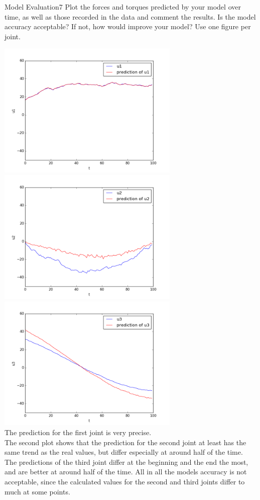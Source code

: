 \begin{questions}
\begin{question}{Model Evaluation}{7}
Plot the forces and torques predicted by your model over time, as well as those recorded in the data and comment the results. Is the model accuracy acceptable? If not, how would improve your model? Use one figure per joint.

\begin{answer}
	\includegraphics[width=87mm]{ML/first_joint.png}
	\includegraphics[width=87mm]{ML/second_joint.png}
	\includegraphics[width=87mm]{ML/third_joint.png}\\
	
	The prediction for the first joint is very precise.\\
	The second plot shows that the prediction for the second joint at least has the same trend as the real values, but differ especially at around half of the time.\\
	The predictions of the third joint differ at the beginning and the end the most, and are better at around half of the time. 
	All in all the models accuracy is not acceptable, since the calculated values for the second and third joints differ to much at some points.\\
	

\end{answer}
\end{question}
\end{questions}
